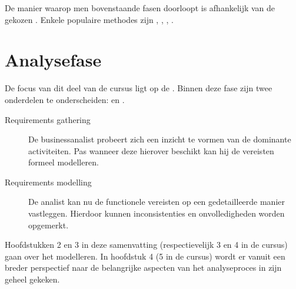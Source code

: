 \documentclass[../main.tex]{subfiles}
\begin{document}
\noindent
De manier waarop men bovenstaande fasen doorloopt is afhankelijk van de gekozen . Enkele populaire methodes zijn , , , .

\section{Analysefase}
De focus van dit deel van de cursus ligt op de . Binnen deze fase zijn twee onderdelen te onderscheiden:  en .

\begin{description}
	\item[Requirements gathering] De businessanalist probeert zich een inzicht te vormen van de dominante activiteiten. Pas wanneer deze hierover beschikt kan hij de vereisten formeel modelleren.
	\item[Requirements modelling] De analist kan nu de functionele vereisten op een gedetailleerde manier vastleggen. Hierdoor kunnen inconsistenties en onvolledigheden worden opgemerkt.
\end{description}
\noindent
Hoofdstukken 2 en 3 in deze samenvatting (respectievelijk 3 en 4 in de cursus) gaan over het modelleren. In hoofdstuk 4 (5 in de cursus) wordt er vanuit een breder perspectief naar de belangrijke aspecten van het analyseproces in zijn geheel gekeken.
\end{document}
